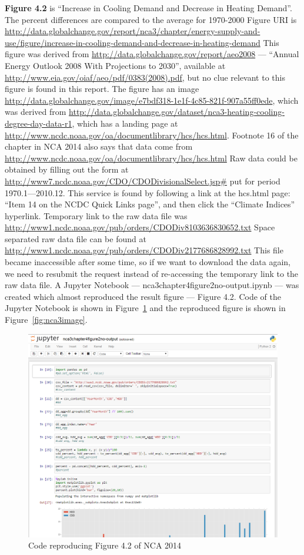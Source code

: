\textbf{Figure 4.2} is ``Increase in Cooling Demand and Decrease in Heating Demand''. The
percent differences are compared to the average for 1970-2000
Figure URI is \url{http://data.globalchange.gov/report/nca3/chapter/energy-supply-and-use/figure/increase-in-cooling-demand-and-decrease-in-heating-demand}
This figure was derived from \url{http://data.globalchange.gov/report/aeo2008} --- ``Annual Energy Outlook 2008 With Projections to 2030'', available at \url{http://www.eia.gov/oiaf/aeo/pdf/0383(2008).pdf}, but no clue relevant to this figure is found in this report.
The figure has an image \url{http://data.globalchange.gov/image/e7bdf318-1e1f-4c85-821f-907a55ff0ede}, which was derived from \url{http://data.globalchange.gov/dataset/nca3-heating-cooling-degree-day-data-r1}, which has a landing page at \url{http://www.ncdc.noaa.gov/oa/documentlibrary/hcs/hcs.html}. Footnote 16 of the chapter in NCA 2014 also says that data come from \url{http://www.ncdc.noaa.gov/oa/documentlibrary/hcs/hcs.html}
Raw data could be obtained by filling out the form at \url{http://www7.ncdc.noaa.gov/CDO/CDODivisionalSelect.jsp#} put for period 1970.1---2010.12.
This service is found by following a link at the hcs.html page: ``Item 14 on the NCDC Quick Links page'', and then click the ``Climate Indices'' hyperlink.
Temporary link to the raw data file was \url{http://www1.ncdc.noaa.gov/pub/orders/CDODiv8103636830652.txt}
Space separated raw data file can be found at  \url{http://www1.ncdc.noaa.gov/pub/orders/CDODiv2177686828992.txt}
This file became inaccessible after some time, so if we want to download the data again, we need to resubmit the request instead of re-accessing the temporary link to the raw data file.
A Jupyter Notebook --- nca3chapter4figure2no-output.ipynb --- was created which almost reproduced the result figure --- Figure 4.2.
Code of the Jupyter Notebook is shown in Figure~\ref{fig:nca3code} and the reproduced figure is shown in Figure~\ref{fig:nca3image}.
\begin{figure}
	\includegraphics[width=\textwidth]{nca3code.png}
	\caption{Code reproducing Figure 4.2 of NCA 2014}
	\label{fig:nca3code}
\end{figure}
